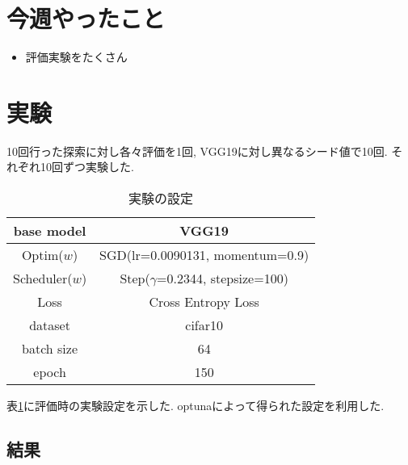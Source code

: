 \documentclass[twocolumn]{jarticle}     %
\begin{document}


\section{今週やったこと}
\begin{itemize}
  \item 評価実験をたくさん
\end{itemize}

\section{実験}

10回行った探索に対し各々評価を1回, VGG19に対し異なるシード値で10回.
それぞれ10回ずつ実験した.

\begin{table}[tb]
  \begin{center}
    \caption{実験の設定}
    \begin{tabular}{|c|c|} \hline
      base model & VGG19 \\ \hline
      Optim($w$) & SGD(lr=0.0090131, momentum=0.9) \\ \hline
      Scheduler($w$) & Step($\gamma$=0.2344, stepsize=100) \\ \hline
      Loss & Cross Entropy Loss \\ \hline
      dataset & cifar10 \\ \hline
      batch size & 64 \\ \hline
      epoch & 150 \\ \hline
    \end{tabular}
    \label{tab:setting}
  \end{center}
\end{table}

表\ref{tab:setting}に評価時の実験設定を示した.
optunaによって得られた設定を利用した.

\subsection{結果}
\end{document}
